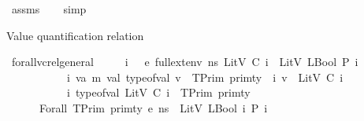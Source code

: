 \begin{isabellebody}
%
\isadelimproof
%
\endisadelimproof
%
\isatagproof
{}\isamarkupfalse%
\ assms\isanewline
\ \ \isamarkupfalse%
\ simp%
\endisatagproof
{\isafoldproof}%
%
\isadelimproof
%
\endisadelimproof
%
\begin{isamarkuptext}%
Value quantification relation%
\end{isamarkuptext}\isamarkuptrue%
\isamarkupfalse%
\ forall{\isacharunderscore}{\kern0pt}vc{\isacharunderscore}{\kern0pt}rel{\isacharunderscore}{\kern0pt}general{\isacharcolon}{\kern0pt}\ \isanewline
\ \ \ {\isachardoublequoteopen}{\isasymAnd}\ i{\isachardot}{\kern0pt}\ {\isasymLambda}{\isacharcomma}{\kern0pt}{\isasymGamma}{\isacharcomma}{\kern0pt}{\isasymOmega}\ {\isasymturnstile}\ {\isasymlangle}e{\isacharcomma}{\kern0pt}\ full{\isacharunderscore}{\kern0pt}ext{\isacharunderscore}{\kern0pt}env\ ns\ {\isacharparenleft}{\kern0pt}LitV\ {\isacharparenleft}{\kern0pt}C\ i{\isacharparenright}{\kern0pt}{\isacharparenright}{\kern0pt}{\isasymrangle}\ {\isasymDown}\ LitV\ {\isacharparenleft}{\kern0pt}LBool\ {\isacharparenleft}{\kern0pt}P\ i{\isacharparenright}{\kern0pt}{\isacharparenright}{\kern0pt}{\isachardoublequoteclose}\ \isanewline
\ \ \ \ \ \ \ \ \ \ {\isachardoublequoteopen}{\isasymAnd}\ i\ v{\isacharcolon}{\kern0pt}{\isacharcolon}{\kern0pt}{\isacharparenleft}{\kern0pt}{\isacharprime}{\kern0pt}a{\isacharcomma}{\kern0pt}\ {\isacharprime}{\kern0pt}m{\isacharparenright}{\kern0pt}\ val{\isachardot}{\kern0pt}\ type{\isacharunderscore}{\kern0pt}of{\isacharunderscore}{\kern0pt}val\ v\ {\isacharequal}{\kern0pt}\ TPrim\ primty\ {\isasymLongrightarrow}\ {\isasymexists}i{\isachardot}{\kern0pt}\ v\ {\isacharequal}{\kern0pt}\ LitV\ {\isacharparenleft}{\kern0pt}C\ i{\isacharparenright}{\kern0pt}{\isachardoublequoteclose}\isanewline
\ \ \ \ \ \ \ \ \ \ {\isachardoublequoteopen}{\isasymAnd}\ i{\isachardot}{\kern0pt}\ type{\isacharunderscore}{\kern0pt}of{\isacharunderscore}{\kern0pt}val\ {\isacharparenleft}{\kern0pt}LitV\ {\isacharparenleft}{\kern0pt}C\ i{\isacharparenright}{\kern0pt}{\isacharparenright}{\kern0pt}\ {\isacharequal}{\kern0pt}\ TPrim\ primty{\isachardoublequoteclose}\isanewline
\ \ \ \ {\isachardoublequoteopen}{\isasymLambda}{\isacharcomma}{\kern0pt}{\isasymGamma}{\isacharcomma}{\kern0pt}{\isasymOmega}\ {\isasymturnstile}\ {\isasymlangle}Forall\ {\isacharparenleft}{\kern0pt}TPrim\ primty{\isacharparenright}{\kern0pt}\ e{\isacharcomma}{\kern0pt}\ ns{\isasymrangle}\ {\isasymDown}\ LitV\ {\isacharparenleft}{\kern0pt}LBool\ {\isacharparenleft}{\kern0pt}{\isasymforall}i{\isachardot}{\kern0pt}\ P\ i{\isacharparenright}{\kern0pt}{\isacharparenright}{\kern0pt}{\isachardoublequoteclose}\isanewline

\end{isabellebody}
